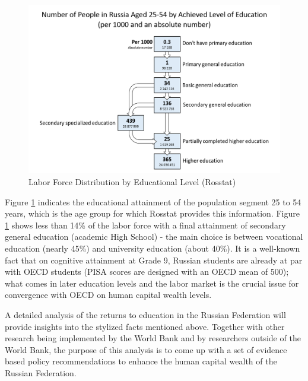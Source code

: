 \documentclass[alpha-refs]{wiley-article-01g}
\begin{document}
\vspace{-0.2in}

\begin{center}
	\begin{figure}[htbp!]
\begin{minipage}[b]{1\linewidth}
			\centering
			\hspace*{-0.7in}
			\includegraphics[width=5in]{graph_1c.png}
		\end{minipage}
			\caption{Labor Force Distribution by Educational Level (Rosstat)}\label{fig:1.1a}
	\end{figure}
\end{center}


\vspace{-2em}


Figure \ref{fig:1.1a} indicates the educational attainment of the population segment 25 to 54 years, which is the age group for which Rosstat provides this information. Figure \ref{fig:1.1a}  shows less than 14\% of the labor force with a final attainment of secondary general education (academic High School) - the main choice is between vocational education (nearly 45\%) and university education (about 40\%). It is a well-known fact that on cognitive attainment at Grade 9, Russian students are already at par with OECD students (PISA scores are designed with an OECD mean of 500); what comes in later education levels and the labor market is the crucial issue for convergence with OECD on human capital wealth levels. 

A detailed analysis of the returns to education in the Russian Federation will provide insights into the stylized facts mentioned above. Together with other research being implemented by the World Bank and by researchers outside of the World Bank, the purpose of this analysis is to come up with a set of evidence based policy recommendations to enhance the human capital wealth of the Russian Federation. 
\end{document}
